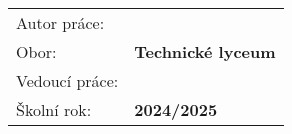 \setlength{\headheight}{64pt}

\pagestyle{titulka}

\begin{center}
	\vspace{1cm}
		\large{\textbf{\skola}}
	\par	
	\vspace{7cm} \par	
		\large{\textbf{\typPrace}}
	\par
		\parbox[t]{12cm}{\center\large{\nazevCZ}}
	\vspace{6cm} \par
\end{center}


\begin{tabular}{ll}
	Autor práce: & \textbf{\autor}	\\
        Obor: & \textbf{Technické lyceum}	\\
	Vedoucí práce: & \textbf{\vedouci} \\
	Školní rok: & \textbf{2024/2025} \\
\end{tabular}		

\vspace{1cm}